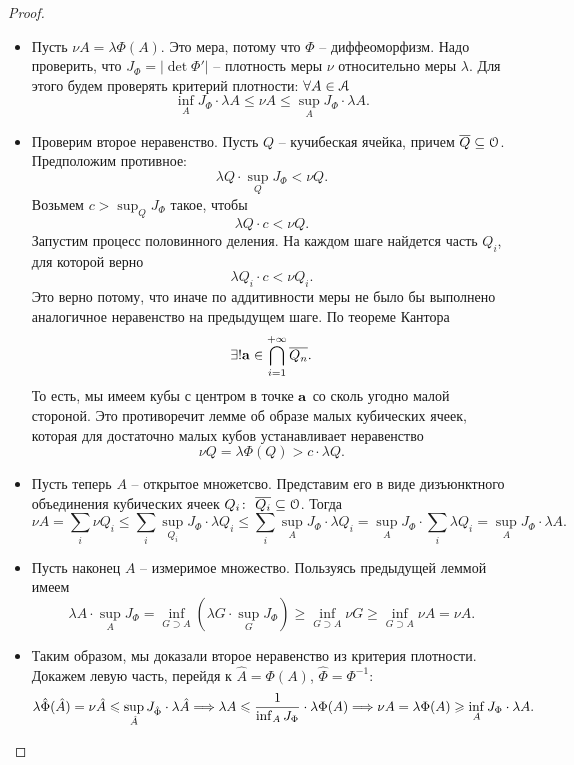 \begin{proof}
    \enewline
    \begin{itemize}
        \item Пусть $\nu{A} = \lambda{\Phi(A)}$. Это мера, потому что $\Phi$ -- диффеоморфизм. Надо проверить,
            что $J_\Phi = |\det{\Phi'}|$ -- плотность меры $\nu$ относительно меры $\lambda$. Для этого
            будем проверять критерий плотности: $\forall A \in \mathcal{A}$
            \[
                \inf_A{J_\Phi} \cdot \lambda{A} \leqslant \nu{A} \leqslant \sup_A{J_\Phi} \cdot \lambda{A}
            .\]
        \item Проверим второе неравенство. Пусть $Q$ -- кучибеская ячейка, причем $\overline{Q} \subseteq \mathcal{O}$.
            Предположим противное:
            \[
                \lambda{Q} \cdot \sup_Q{J_\Phi} < \nu{Q}
            .\]
            Возьмем $c > \sup_Q{J_\Phi}$ такое, чтобы
            \[
                \lambda{Q} \cdot c < \nu{Q}
            .\]
            Запустим процесс половинного деления. На каждом шаге найдется часть $Q_i$, для которой
            верно
            \[
                \lambda{Q_i} \cdot c < \nu{Q_i}
            .\]
            Это верно потому, что иначе по аддитивности меры не было бы выполнено аналогичное неравенство
            на предыдущем шаге. По теореме Кантора
            \[
                \exists! \mathbf{a} \in \bigcap_{i = 1}^{+\infty}{\overline{Q_n}}
            .\]
            То есть, мы имеем кубы с центром в точке $\mathbf{a}$ со сколь угодно малой стороной. Это
            противоречит лемме об образе малых кубических ячеек, которая для достаточно малых кубов
            устанавливает неравенство
            \[
                \nu{Q} = \lambda{\Phi(Q)} > c \cdot \lambda{Q}
            .\]
        \item Пусть теперь $A$ -- открытое множетсво. Представим его в виде дизъюнктного объединения
            кубических ячеек $Q_i \colon~ \overline{Q_i} \subseteq \mathcal{O}$. Тогда
            \[
                \nu{A} = \sum_i{\nu{Q_i}} \leqslant \sum_i{\sup_{Q_i}{J_\Phi} \cdot \lambda{Q_i}} \leqslant
                \sum_i{\sup_A{J_\Phi} \cdot \lambda{Q_i}} = \sup_A{J_\Phi} \cdot \sum_i{\lambda{Q_i}} =
                \sup_A{J_\Phi} \cdot \lambda{A}
            .\]
        \item Пусть наконец $A$ -- измеримое множество. Пользуясь предыдущей леммой имеем
            \[
                \lambda{A} \cdot \sup_A{J_\Phi} = \inf_{G \supset A}{\left(\lambda{G} \cdot \sup_G{J_\Phi}\right)}
                \geqslant \inf_{G \supset A}{\nu{G}} \geqslant \inf_{G \supset A}{\nu{A}} = \nu{A}
            .\]
        \item Таким образом, мы доказали второе неравенство из критерия плотности. Докажем левую часть,
            перейдя к $\hat{A} = \Phi(A)$, $\hat{\Phi} = \Phi^{-1}$:
            \[
                \lambda{\hat{\Phi}(\hat{A})} = \nu{\hat{A}} \leqslant 
                \sup_{\hat{A}}{J_{\hat{\Phi}}} \cdot \lambda{\hat{A}} \Longrightarrow
                \lambda{A} \leqslant \frac{1}{\inf_{A}{J_\Phi}} \cdot \lambda{\Phi(A)} \Longrightarrow
                \nu{A} = \lambda{\Phi(A)} \geqslant \inf_{A}{J_\Phi} \cdot \lambda{A}
            .\]
    \end{itemize}
\end{proof}


